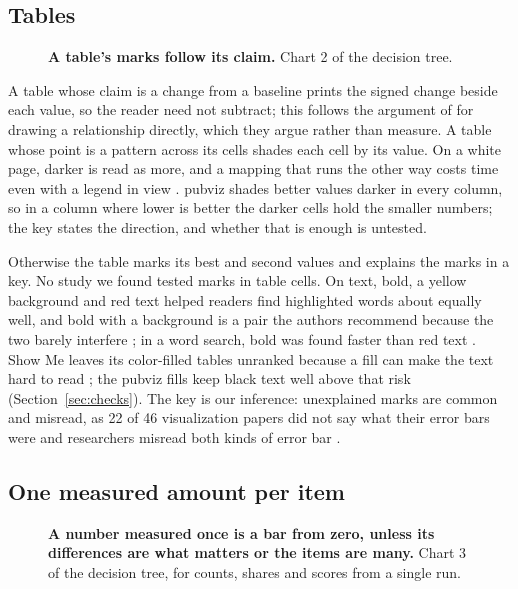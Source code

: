 \documentclass[11pt]{article}
\begin{document}
\subsection{Tables}

\begin{figure}[tb]
  \centering
  \pvtreeTables
  \caption{\textbf{A table's marks follow its claim.} Chart 2 of the
    decision tree.}
  \label{fig:tree-tables}
\end{figure}

A table whose claim is a change from a baseline prints the signed change
beside each value, so the reader need not subtract; this follows the argument
of \citet[Sec.~2]{gleicher2011visual} for drawing a relationship directly,
which they argue rather than measure. A table whose point is a pattern across
its cells shades each cell by its value. On a white page, darker is read as
more, and a mapping that runs the other way costs time even with a legend in
view \citep[Sec.~3]{schloss2019mapping}. pubviz shades better values darker
in every column, so in a column where lower is better the darker cells hold
the smaller numbers; the key states the direction, and whether that is
enough is untested.

Otherwise the table marks its best and second values and explains the marks
in a key. No study we found tested marks in table cells. On text, bold, a
yellow background and red text helped readers find highlighted words about
equally well, and bold with a background is a pair the authors recommend
because the two barely interfere \citep[Fig.~3, Secs.~6.3, 8.1]{strobelt2016guidelines};
in a word search, bold was found faster than red text
\citep[Tables~2--3]{doi2023highlighting}. Show Me leaves its color-filled
tables unranked because a fill can make the text hard to read
\citep[Sec.~5.2]{mackinlay2007showme}; the pubviz fills keep black text
well above that risk (Section~\ref{sec:checks}). The key is our inference:
unexplained marks are common and misread, as 22 of 46 visualization papers
did not say what their error bars were \citep[Sec.~2.3]{correll2014error} and
researchers misread both kinds of error bar \citep[p.~393]{belia2005researchers}.

\subsection{One measured amount per item}

\begin{figure}[tb]
  \centering
  \pvtreeAmounts
  \caption{\textbf{A number measured once is a bar from zero, unless its
    differences are what matters or the items are many.} Chart 3 of the
    decision tree, for counts, shares and scores from a single run.}
  \label{fig:tree-amounts}
\end{figure}
\end{document}
